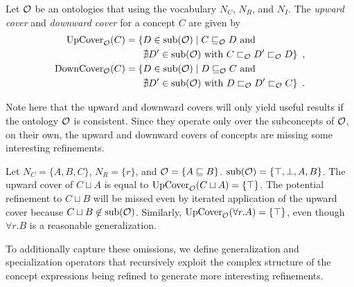 \begin{definition} \label{def:alc-covers}
  Let $\mathcal{O}$ be an \ALC ontologies that using the vocabulary $N_C$, $N_R$, and $N_I$. The \emph{upward cover} and \emph{downward cover} for a concept $C$ are given by
  \begin{align*}
    {\ensuremath{\operatorname{UpCover}}}_\mathcal{O}(C) = \{ & D \in {\ensuremath{\operatorname{sub}}}(\mathcal{O}) \mid C \sqsubseteq_\mathcal{O} D \text{ and } \\
    & \nexists D' \in {\ensuremath{\operatorname{sub}}}(\mathcal{O}) \text{ with } C \sqsubset_\mathcal{O} D' \sqsubset_\mathcal{O} D \} \enspace, \\
    {\operatorname{DownCover}}_\mathcal{O}(C) = \{ & D \in {\ensuremath{\operatorname{sub}}}(\mathcal{O}) \mid D \sqsubseteq_\mathcal{O} C \text{ and } \\
    & \nexists D' \in {\ensuremath{\operatorname{sub}}}(\mathcal{O}) \text{ with } D \sqsubset_\mathcal{O} D' \sqsubset_\mathcal{O} C \} \enspace.
  \end{align*}
\end{definition}

Note here that the upward and downward covers will only yield useful results if the ontology $\mathcal{O}$ is consistent. Since they operate only over the subconcepts of $\mathcal{O}$, on their own, the upward and downward covers of concepts are missing some interesting refinements.
\begin{example} \label{ex:up-cover-alc}
  Let $N_C = \{ A, B, C \}$, $N_R = \{ r \}$, and $\mathcal{O} = \{ A \sqsubseteq B \}$. ${\operatorname{sub}}(\mathcal{O}) = \{\top, \bot, A, B\}$. The upward cover of $C \sqcup A$ is equal to ${\operatorname{UpCover}}_\mathcal{O}(C \sqcup A) = \{ \top \}$. The potential refinement to $C \sqcup B$ will be missed even by iterated application of the upward cover because $C \sqcup B \not\in {\ensuremath{\operatorname{sub}}}(\mathcal{O})$. Similarly, ${\operatorname{UpCover}}_\mathcal{O}(\forall r.A) = \{ \top \}$, even though $\forall r.B$ is a reasonable generalization.
\end{example}

To additionally capture these omissions, we define generalization and specialization operators that recursively exploit the complex structure of the concept expressions being refined to generate more interesting refinements.

